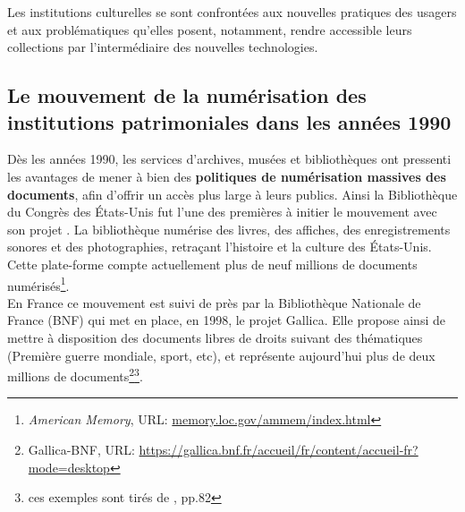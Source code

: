 Les institutions culturelles se sont confrontées aux nouvelles pratiques des usagers et aux problématiques qu'elles posent, notamment, rendre accessible leurs collections par l'intermédiaire des nouvelles technologies. 

\subsection{Le mouvement de la numérisation des institutions patrimoniales dans les années 1990} 

Dès les années 1990, les services d'archives, musées et bibliothèques ont pressenti les avantages de mener à bien des \textbf{politiques de numérisation massives des documents}, afin d'offrir un accès plus large à leurs publics. Ainsi la Bibliothèque du Congrès des États-Unis fut l'une des premières à initier le mouvement avec son projet . La bibliothèque numérise des livres, des affiches, des enregistrements sonores et des photographies, retraçant l'histoire et la culture des États-Unis. Cette plate-forme compte actuellement plus de neuf millions de documents numérisés\footnote{\textit{American Memory}, URL: \url{memory.loc.gov/ammem/index.html}}.\\ 

En France ce mouvement est suivi de près par la Bibliothèque Nationale de France (BNF) qui met en place, en 1998, le projet Gallica. Elle propose ainsi de mettre à disposition des documents libres de droits suivant des thématiques (Première guerre mondiale, sport, etc), et représente aujourd'hui plus de deux millions de documents\footnote{Gallica-BNF, URL: \url{https://gallica.bnf.fr/accueil/fr/content/accueil-fr?mode=desktop}}\footnote{ces exemples sont tirés de \cite{gillet_introduction_2016}, pp.82}.\\

